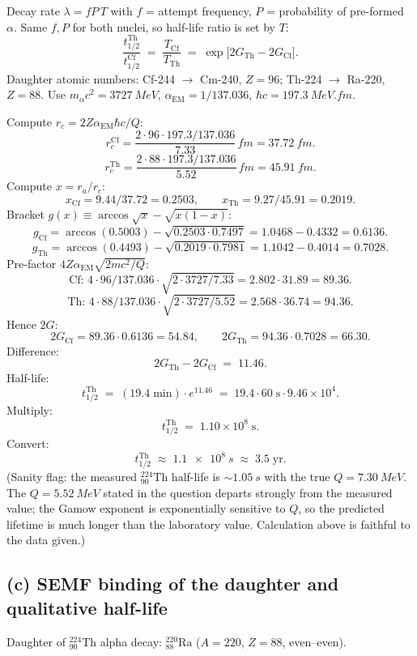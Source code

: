 \documentclass[11pt]{article}
\begin{document}
Decay rate $\lambda = f P\, T$ with $f$ = attempt frequency, $P$ = probability of pre-formed $\alpha$. Same $f,P$ for both nuclei, so half-life ratio is set by $T$:
\[
\frac{t_{1/2}^{\text{Th}}}{t_{1/2}^{\text{Cf}}} \;=\; \frac{T_\text{Cf}}{T_\text{Th}} \;=\; \exp\bigl[2G_\text{Th} - 2G_\text{Cf}\bigr].
\]
Daughter atomic numbers: Cf-244 $\to$ Cm-240, $Z=96$; Th-224 $\to$ Ra-220, $Z=88$. Use $m_\alpha c^2 = \SI{3727}{MeV}$, $\alpha_\text{EM}=1/137.036$, $\hbar c=\SI{197.3}{MeV.fm}$.

Compute $r_c = 2Z\alpha_\text{EM}\hbar c/Q$:
\[
r_c^{\text{Cf}} = \frac{2\cdot 96\cdot 197.3/137.036}{7.33}\,\si{fm} = \SI{37.72}{fm}.
\]
\[
r_c^{\text{Th}} = \frac{2\cdot 88\cdot 197.3/137.036}{5.52}\,\si{fm} = \SI{45.91}{fm}.
\]
Compute $x=r_a/r_c$:
\[
x_\text{Cf} = 9.44/37.72 = 0.2503,\qquad x_\text{Th} = 9.27/45.91 = 0.2019.
\]
Bracket $g(x)\equiv\arccos\sqrt{x}-\sqrt{x(1-x)}$:
\[
g_\text{Cf} = \arccos(0.5003) - \sqrt{0.2503\cdot 0.7497} = 1.0468 - 0.4332 = 0.6136.
\]
\[
g_\text{Th} = \arccos(0.4493) - \sqrt{0.2019\cdot 0.7981} = 1.1042 - 0.4014 = 0.7028.
\]
Pre-factor $4Z\alpha_\text{EM}\sqrt{2mc^2/Q}$:
\[
\text{Cf: } 4\cdot 96/137.036 \cdot\sqrt{2\cdot 3727/7.33} = 2.802\cdot 31.89 = 89.36.
\]
\[
\text{Th: } 4\cdot 88/137.036 \cdot\sqrt{2\cdot 3727/5.52} = 2.568\cdot 36.74 = 94.36.
\]
Hence $2G$:
\[
2G_\text{Cf} = 89.36\cdot 0.6136 = 54.84,\qquad 2G_\text{Th} = 94.36\cdot 0.7028 = 66.30.
\]
Difference:
\[
2G_\text{Th}-2G_\text{Cf} \;=\; 11.46.
\]
Half-life:
\[
t_{1/2}^{\text{Th}} \;=\; (19.4\;\text{min})\cdot e^{11.46} \;=\; 19.4\cdot 60\;\text{s}\cdot 9.46\times 10^{4}.
\]
Multiply:
\[
t_{1/2}^{\text{Th}} \;=\; 1.10\times 10^{8}\;\text{s}.
\]
Convert:
\[
\boxed{\;t_{1/2}^{\text{Th}} \;\approx\; \SI{1.1e8}{s} \;\approx\; 3.5\;\text{yr}.\;}
\]
(Sanity flag: the measured $^{224}_{90}\text{Th}$ half-life is $\sim\!\SI{1.05}{s}$ with the true $Q=\SI{7.30}{MeV}$. The $Q=\SI{5.52}{MeV}$ stated in the question departs strongly from the measured value; the Gamow exponent is exponentially sensitive to $Q$, so the predicted lifetime is much longer than the laboratory value. Calculation above is faithful to the data given.)

\subsection*{(c) SEMF binding of the daughter and qualitative half-life}

Daughter of $^{224}_{90}\text{Th}$ alpha decay: $^{220}_{88}\text{Ra}$ ($A=220$, $Z=88$, even--even).
\end{document}
